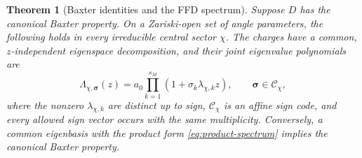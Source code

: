 \documentclass[10pt,letterpaper]{article}
\newtheorem{theorem}{Theorem}
\begin{document}
\begin{theorem}[Baxter identities and the FFD spectrum]\label{thm:baxter-spectrum}
Suppose \(D\) has the canonical Baxter property.  On a Zariski-open set of angle parameters, the following holds in every irreducible central sector \(\chi\).  The charges have a common, \(z\)-independent eigenspace decomposition, and their joint eigenvalue polynomials are
\begin{equation}\label{eq:product-spectrum}
 \Lambda_{\chi,\bm\sigma}(z)
 =a_0\prod_{k=1}^{s_M}(1+\sigma_k\lambda_{\chi,k}z),
 \qquad \bm\sigma\in\mathcal C_\chi,
\end{equation}
where the nonzero \(\lambda_{\chi,k}\) are distinct up to sign, \(\mathcal C_\chi\) is an affine sign code, and every allowed sign vector occurs with the same multiplicity.  Conversely, a common eigenbasis with the product form \eqref{eq:product-spectrum} implies the canonical Baxter property.
\end{theorem}
\end{document}

